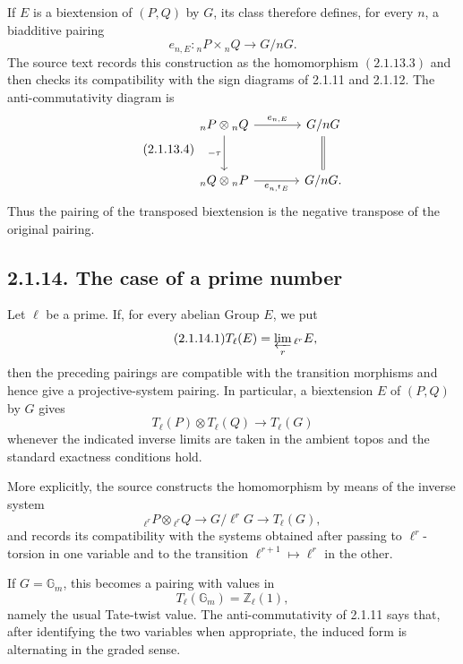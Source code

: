 \documentclass[11pt]{article}
\providecommand{\Gm}{\mathbb G_m}
\providecommand{\limproj}{\varprojlim}
\begin{document}
If \(E\) is a biextension of \((P,Q)\) by \(G\), its class therefore defines, for every \(n\), a biadditive pairing
\begin{equation}\tag{2.1.13.3}
        e_{n,E}:{}_nP\times {}_nQ\longrightarrow G/nG.
\end{equation}
The source text records this construction as the homomorphism \((2.1.13.3)\) and then checks its compatibility with the sign diagrams of 2.1.11 and 2.1.12.  The anti-commutativity diagram is
\begin{equation}\tag{2.1.13.4}
\begin{tikzcd}[column sep=large,row sep=large]
{}_nP\otimes{}_nQ\arrow[r,"e_{n,E}"]\arrow[d,"-\tau"']&G/nG\arrow[d,equal]\\
{}_nQ\otimes{}_nP\arrow[r,"e_{n,{}^{t}E}"']&G/nG .
\end{tikzcd}
\end{equation}
Thus the pairing of the transposed biextension is the negative transpose of the original pairing.

\subsection*{2.1.14. The case of a prime number}

Let \(\ell\) be a prime.  If, for every abelian Group \(E\), we put
\begin{equation}\tag{2.1.14.1}
        T_\ell(E)=\limproj_r {}_{\ell^r}E,
\end{equation}
then the preceding pairings are compatible with the transition morphisms and hence give a projective-system pairing.  In particular, a biextension \(E\) of \((P,Q)\) by \(G\) gives
\begin{equation}\tag{2.1.14.2}
        T_\ell(P)\otimes T_\ell(Q)\longrightarrow T_\ell(G)
\end{equation}
whenever the indicated inverse limits are taken in the ambient topos and the standard exactness conditions hold.

More explicitly, the source constructs the homomorphism by means of the inverse system
\[
        {}_{\ell^r}P\otimes {}_{\ell^r}Q\longrightarrow G/\ell^rG
\longrightarrow T_\ell(G),
\]
and records its compatibility with the systems obtained after passing to \(\ell^r\)-torsion in one variable and to the transition \(\ell^{r+1}\mapsto \ell^r\) in the other.

If \(G=\Gm\), this becomes a pairing with values in
\[
        T_\ell(\Gm)=\mathbb Z_\ell(1),
\]
namely the usual Tate-twist value.  The anti-commutativity of 2.1.11 says that, after identifying the two variables when appropriate, the induced form is alternating in the graded sense.
\end{document}
